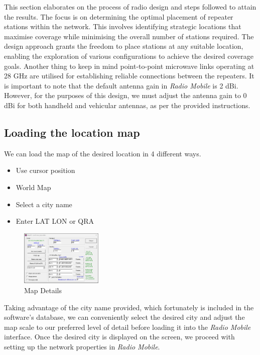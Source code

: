 This section elaborates on the process of radio design and steps followed to attain the results.
The focus is on determining the optimal placement of repeater stations within the network. This involves identifying strategic locations that maximise coverage while minimising the overall number of stations required.
The design approach grants the freedom to place stations at any suitable location, enabling the exploration of various configurations to achieve the desired coverage goals.
Another thing to keep in mind point-to-point microwave links operating at 28 GHz are utilised for establishing reliable connections between the repeaters.
It is important to note that the default antenna gain in \textit{Radio Mobile} is 2 dBi. However, for the purposes of this design, we must adjust the antenna gain to 0 dBi for both handheld and vehicular antennas, as per the provided instructions.

\subsection{Loading the location map}

We can load the map of the desired location in 4 different ways.
\begin{itemize}
    \item Use cursor position
    \item World Map
    \item Select a city name
    \item Enter LAT LON or QRA
\end{itemize}

\begin{figure}
\vspace{-3mm}
\centering
\includegraphics[width=0.35\textwidth]{Images/Map details.png}
\caption{\small Map Details}
\label{fig:MapDets}
\end{figure}

Taking advantage of the city name provided, which fortunately is included in the software's database, we can conveniently select the desired city and adjust the map scale to our preferred level of detail before loading it into the \textit{Radio Mobile} interface\cite{RadMobHndBk}.
Once the desired city is displayed on the screen, we proceed with setting up the network properties in \textit{Radio Mobile}.


